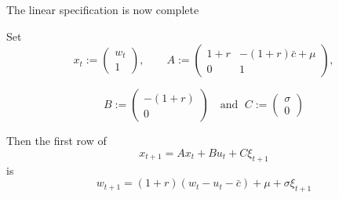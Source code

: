 \begin{frame}
    
    The linear specification is now complete

    Set
    \begin{equation*}
        x_t := 
        \begin{pmatrix}
            w_t
            \\
            1
        \end{pmatrix},
        \qquad
        A :=
        \left(
        \begin{array}{cc}
            1 + r & -(1 + r) \bar c + \mu \\
            0     & 1
        \end{array}
        \right),
    \end{equation*}


        \vspace{0.5em}
    \begin{equation*}
        B :=
        \left(
        \begin{array}{c}
            -(1+r) \\
            0
        \end{array}
        \right)
        \quad \text{and } \;
        C :=
        \left(
        \begin{array}{c}
        \sigma \\
            0
        \end{array}
        \right)
    \end{equation*}

    Then the first row of
    \begin{equation*}
        x_{t+1} = A x_t + B u_t + C \xi_{t+1}
    \end{equation*}
    is
    \begin{equation*}
        w_{t+1} = (1 + r) (w_t - u_t - \bar c) + \mu + \sigma \xi_{t+1} 
    \end{equation*}

\end{frame}





